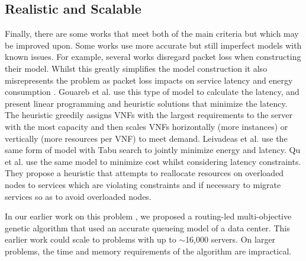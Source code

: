 \subsection{Realistic and Scalable}
Finally, there are some works that meet both of the main criteria but which may be improved upon. Some works use more accurate but still imperfect models with known issues. For example, several works disregard packet loss when constructing their model. Whilst this greatly simplifies the model construction it also misrepresents the problem as packet loss impacts on service latency and energy consumption \cite{BillingsleyLMMG22}. Gouareb \cite{GouarebFA18} et al. use this type of model to calculate the latency, and present linear programming and heuristic solutions that minimize the latency. The heuristic greedily assigns VNFs with the largest requirements to the server with the most capacity and then scales VNFs horizontally (more instances) or vertically (more resources per VNF) to meet demand. Leivadeas et al. \cite{LeivadeasFLIK18} use the same form of model with Tabu search to jointly minimize energy and latency. Qu et al. \cite{QuZYSLR20} use the same model to minimize cost whilst considering latency constraints. They propose a heuristic that attempts to reallocate resources on overloaded nodes to services which are violating constraints and if necessary to migrate services so as to avoid overloaded nodes.

In our earlier work on this problem \cite{BillingsleyLMMG20}, we proposed a routing-led multi-objective genetic algorithm that used an accurate queueing model of a data center. This earlier work could scale to problems with up to $\sim$16,000 servers. On larger problems, the time and memory requirements of the algorithm are impractical.

